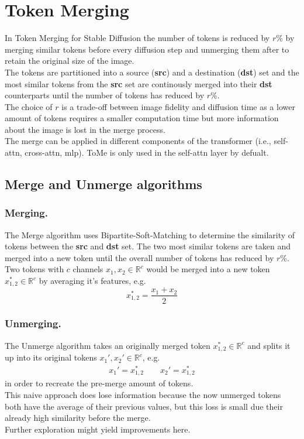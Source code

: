\section{Token Merging}
In Token Merging for Stable Diffusion \cite{bolya2023tomesd} the number of tokens is reduced by \(r\)\% by merging similar tokens before every diffusion step and unmerging them after to retain the original size of the image.\\
The tokens are partitioned into a source (\textbf{src}) and a destination (\textbf{dst}) set and the most similar tokens from the \textbf{src} set are continously merged into their \textbf{dst} counterparts until the number of tokens has reduced by \(r\)\%.\\
The choice of \(r\) is a trade-off between image fidelity and diffusion time as a lower amount of tokens requires a smaller computation time but more information about the image is lost in the merge process.\\
The merge can be applied in different components of the transformer (i.e., self-attn, cross-attn, mlp). ToMe is only used in the self-attn layer by defualt.



\subsection{Merge and Unmerge algorithms}
\subsubsection*{Merging.} The Merge algorithm uses Bipartite-Soft-Matching to determine the similarity of tokens between the \textbf{src} and \textbf{dst} set. The two most similar tokens are taken and merged into a new token until the overall number of tokens has reduced by \(r\%\).\\
Two tokens with \(c\) channels \(x_1, x_2 \in \mathbb{R}^c\) would be merged into a new token \(x_{1,2}^* \in \mathbb{R}^c \) by averaging it's features, e.g. \[x_{1,2}^* = \frac{x_1 + x_2}{2}\]



\subsubsection*{Unmerging.} The Unmerge algorithm takes an originally merged token $x_{1,2}^* \in \mathbb{R}^c$ and splits it up into its original tokens $x_1', x_2' \in \mathbb{R}^c$, e.g. 
\begin{align*}
    x_1' = x_{1,2}^* \quad\quad
    x_2' = x_{1,2}^*
\end{align*}
in order to recreate the pre-merge amount of tokens.\\
This naive approach does lose information because the now unmerged tokens both have the average of their previous values, but this loss is small due their already high similarity before the merge.\\ Further exploration might yield improvements here.



